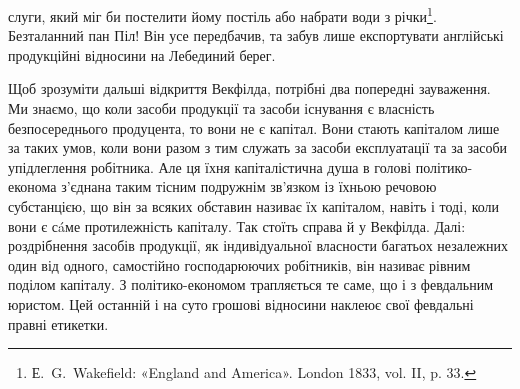 \parcont{}  %
слуги, який міг би постелити йому постіль або набрати води з річки\footnote{
Е.~G.~Wakefield: «England and America». London 1833, vol. II, p. 33.
}. Безталанний пан Піл! Він усе
передбачив, та забув лише експортувати англійські продукційні відносини на Лебединий берег.

Щоб зрозуміти дальші відкриття Векфілда, потрібні два попередні зауваження. Ми знаємо, що коли
засоби продукції та засоби існування є власність безпосереднього продуцента, то вони не є капітал.
Вони стають капіталом лише за таких умов, коли вони разом з тим служать за засоби експлуатації та за
засоби упідлеглення робітника. Але ця їхня капіталістична душа в голові політико-економа з’єднана
таким тісним подружнім зв’язком із їхньою речовою субстанцією, що він за всяких обставин називає їх
капіталом, навіть і тоді, коли вони є сáме протилежність капіталу. Так стоїть справа й у Векфілда.
Далі: роздрібнення засобів продукції, як індивідуальної власности багатьох незалежних один від
одного, самостійно господарюючих робітників, він називає рівним поділом капіталу. З
політико-економом трапляється те саме, що і з февдальним юристом. Цей останній і на суто грошові
відносини наклеює свої февдальні правні етикетки.

